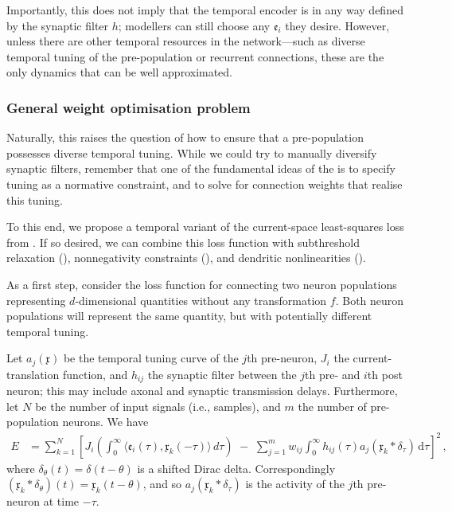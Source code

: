 Importantly, this does not imply that the temporal encoder is in any way defined by the synaptic filter $h$; modellers can still choose any $\mathfrak{e}_i$ they desire.
However, unless there are other temporal resources in the network---such as diverse temporal tuning of the pre-population or recurrent connections, these are the only dynamics that can be well approximated.


\subsubsection{General weight optimisation problem}
Naturally, this raises the question of how to ensure that a pre-population possesses diverse temporal tuning.
While we could try to manually diversify synaptic filters, remember that one of the fundamental ideas of the \NEF is to specify tuning as a normative constraint, and to solve for connection weights that realise this tuning.

To this end, we propose a temporal variant of the current-space least-squares loss from .
If so desired, we can combine this loss function with subthreshold relaxation (), nonnegativity constraints (), and dendritic nonlinearities ().

As a first step, consider the loss function for connecting two neuron populations representing $d$-dimensional quantities without any transformation $f$.
Both neuron populations will represent the same quantity, but with potentially different temporal tuning.

Let $a_j(\mathfrak{x})$ be the temporal tuning curve of the $j$th pre-neuron, $J_i$ the current-translation function, and $h_{ij}$ the synaptic filter between the $j$th pre- and $i$th post neuron; this may include axonal and synaptic transmission delays.
Furthermore, let $N$ be the number of input signals (i.e., samples), and $m$ the number of pre-population neurons.
We have
\begin{align}
	E &= \sum_{k = 1}^N \left[
		J_i \left( \! \int_0^\infty \!\!\! \big\langle \mathfrak{e}_i(\tau), \mathfrak{x}_k(-\tau) \big\rangle \, \mathit{d\tau} \right) \,\,-\,\,
		\sum_{j = 1}^m w_{ij} \! \int_0^\infty \!\!\! h_{ij}(\tau) a_j(\mathfrak{x}_k \ast \delta_\tau) \,\mathrm{d}\tau
	\right]^2 \,,
	\label{eqn:weight_optimise_currents_temporal_no_trafo}
\end{align}
where $\delta_{\theta}(t) = \delta(t - \theta)$ is a shifted Dirac delta.
Correspondingly $(\mathfrak{x}_k \ast \delta_{\theta})(t) = \mathfrak{x}_k(t - \theta)$, and so $a_j(\mathfrak{x}_k \ast \delta_\tau)$ is the activity of the $j$th pre-neuron at time $-\tau$.

